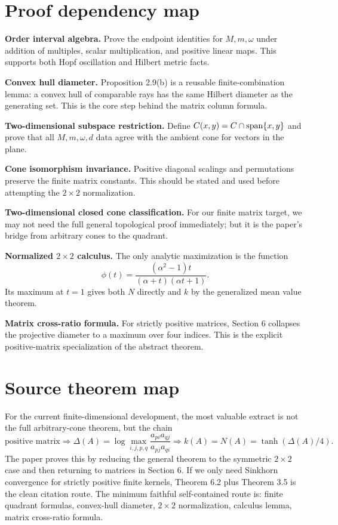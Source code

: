 \section{Proof dependency map}

\begin{distillation}
\item \textbf{Order interval algebra.}  Prove the endpoint identities for $M,m,\omega$ under addition of multiples, scalar multiplication, and positive linear maps.  This supports both Hopf oscillation and Hilbert metric facts.
\item \textbf{Convex hull diameter.}  Proposition 2.9(b) is a reusable finite-combination lemma: a convex hull of comparable rays has the same Hilbert diameter as the generating set.  This is the core step behind the matrix column formula.
\item \textbf{Two-dimensional subspace restriction.}  Define $C(x,y)=C\cap\operatorname{span}\{x,y\}$ and prove that all $M,m,\omega,d$ data agree with the ambient cone for vectors in the plane.
\item \textbf{Cone isomorphism invariance.}  Positive diagonal scalings and permutations preserve the finite matrix constants.  This should be stated and used before attempting the $2\times2$ normalization.
\item \textbf{Two-dimensional closed cone classification.}  For our finite matrix target, we may not need the full general topological proof immediately; but it is the paper's bridge from arbitrary cones to the quadrant.
\item \textbf{Normalized $2\times2$ calculus.}  The only analytic maximization is the function
\[
  \phi(t)=\frac{(\alpha^2-1)t}{(\alpha+t)(\alpha t+1)}.
\]
Its maximum at $t=1$ gives both $N$ directly and $k$ by the generalized mean value theorem.
\item \textbf{Matrix cross-ratio formula.}  For strictly positive matrices, Section 6 collapses the projective diameter to a maximum over four indices.  This is the explicit positive-matrix specialization of the abstract theorem.
\end{distillation}

\section*{Source theorem map}
For the current finite-dimensional development, the most valuable extract is not the full arbitrary-cone theorem, but the chain
\[
  \text{positive matrix}
  \Rightarrow
  \Delta(A)=\log\max_{i,j,p,q}\frac{a_{p i}a_{q j}}{a_{p j}a_{q i}}
  \Rightarrow
  k(A)=N(A)=\tanh(\Delta(A)/4).
\]
The paper proves this by reducing the general theorem to the symmetric $2\times2$ case and then returning to matrices in Section 6.
If we only need Sinkhorn convergence for strictly positive finite kernels, Theorem 6.2 plus Theorem 3.5 is the clean citation route.
The minimum faithful self-contained route is: finite quadrant formulas, convex-hull diameter, $2\times2$ normalization, calculus lemma, matrix cross-ratio formula.



